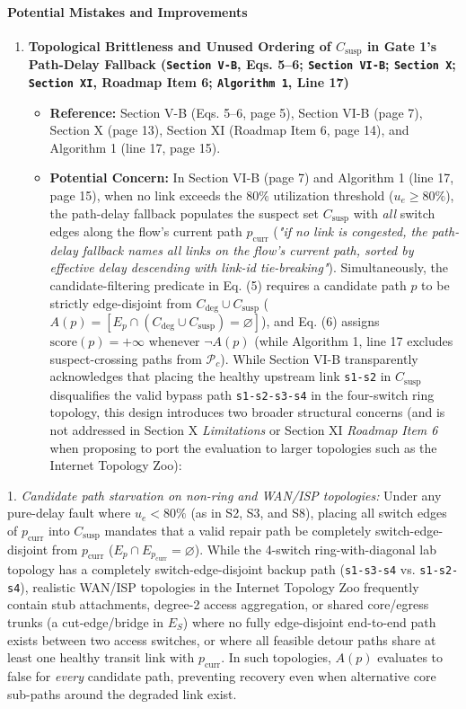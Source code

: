 \documentclass[11pt,a4paper]{article}
\begin{document}
\paragraph{Potential Mistakes and Improvements}
\begin{enumerate}[leftmargin=1.6em,itemsep=3pt]
\item \textbf{Topological Brittleness and Unused Ordering of $C_{\text{susp}}$ in Gate 1's Path-Delay Fallback (\texttt{Section V-B}, Eqs. 5–6; \texttt{Section VI-B}; \texttt{Section X}; \texttt{Section XI}, Roadmap Item 6; \texttt{Algorithm 1}, Line 17)}
\begin{itemize}[leftmargin=1.8em,itemsep=2pt]
\item \textbf{Reference:} Section V-B (Eqs. 5–6, page 5), Section VI-B (page 7), Section X (page 13), Section XI (Roadmap Item 6, page 14), and Algorithm 1 (line 17, page 15).
\item \textbf{Potential Concern:} In Section VI-B (page 7) and Algorithm 1 (line 17, page 15), when no link exceeds the $80\%$ utilization threshold ($u_e \ge 80\%$), the path-delay fallback populates the suspect set $C_{\text{susp}}$ with \emph{all} switch edges along the flow's current path $p_{\text{curr}}$ (\emph{"if no link is congested, the path-delay fallback names all links on the flow's current path, sorted by effective delay descending with link-id tie-breaking"}). Simultaneously, the candidate-filtering predicate in Eq. (5) requires a candidate path $p$ to be strictly edge-disjoint from $C_{\text{deg}} \cup C_{\text{susp}}$ ($A(p) = [E_p \cap (C_{\text{deg}} \cup C_{\text{susp}}) = \varnothing]$), and Eq. (6) assigns $\text{score}(p) = +\infty$ whenever $\neg A(p)$ (while Algorithm 1, line 17 excludes suspect-crossing paths from $\mathcal{P}_c$). While Section VI-B transparently acknowledges that placing the healthy upstream link \texttt{s1-s2} in $C_{\text{susp}}$ disqualifies the valid bypass path \texttt{s1-s2-s3-s4} in the four-switch ring topology, this design introduces two broader structural concerns (and is not addressed in Section X \emph{Limitations} or Section XI \emph{Roadmap Item 6} when proposing to port the evaluation to larger topologies such as the Internet Topology Zoo):
\end{itemize}
\end{enumerate}
1. \emph{Candidate path starvation on non-ring and WAN/ISP topologies:} Under any pure-delay fault where $u_e < 80\%$ (as in S2, S3, and S8), placing all switch edges of $p_{\text{curr}}$ into $C_{\text{susp}}$ mandates that a valid repair path be completely switch-edge-disjoint from $p_{\text{curr}}$ ($E_p \cap E_{p_{\text{curr}}} = \varnothing$). While the 4-switch ring-with-diagonal lab topology has a completely switch-edge-disjoint backup path (\texttt{s1-s3-s4} vs. \texttt{s1-s2-s4}), realistic WAN/ISP topologies in the Internet Topology Zoo frequently contain stub attachments, degree-2 access aggregation, or shared core/egress trunks (a cut-edge/bridge in $E_S$) where no fully edge-disjoint end-to-end path exists between two access switches, or where all feasible detour paths share at least one healthy transit link with $p_{\text{curr}}$. In such topologies, $A(p)$ evaluates to false for \emph{every} candidate path, preventing recovery even when alternative core sub-paths around the degraded link exist.
\end{document}
